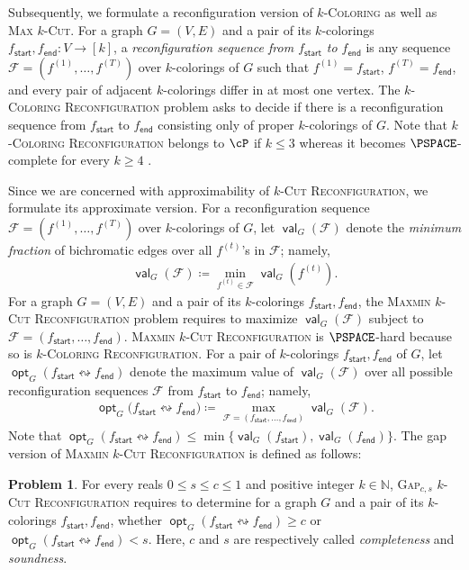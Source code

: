 \documentclass[11pt,fleqn]{article}
\renewcommand{\geq}{\geqslant}
\renewcommand{\leq}{\leqslant}
\newcommand{\prb}[1]{\textsc{#1}\xspace}
\newcommand{\reco}{\leftrightsquigarrow}
\newcommand{\defeq}{\coloneq}
\DeclareMathOperator{\val}{\mathsf{val}}
\DeclareMathOperator{\opt}{\mathsf{opt}}
\newcommand{\sss}{\mathsf{start}}
\newcommand{\ttt}{\mathsf{end}}
\newcommand{\f}{f}
\newcommand{\sqcol}{\scrF}
\newcommand{\kColReconf}{\prb{$k$-Coloring Reconfiguration}}
\newcommand{\kCutReconf}{\prb{$k$-Cut Reconfiguration}}
\newcommand{\MMkCutReconf}{\prb{Maxmin $k$-Cut Reconfiguration}}
\newcommand{\bbN}{\mathbb{N}}
\newcommand{\scrF}{\mathscr{F}}
\theoremstyle{definition}
\newtheorem{problem}[theorem]{Problem}
\numberwithin{equation}{section}
\begin{document}
Subsequently, we formulate a reconfiguration version of
\prb{$k$-Coloring} as well as \prb{Max $k$-Cut}.
For a graph $G=(V,E)$ and a pair of its $k$-colorings
$\f_\sss,\f_\ttt \colon V \to [k]$,
a \emph{reconfiguration sequence from $\f_\sss$ to $\f_\ttt$}
is any sequence
$\sqcol = (\f^{(1)}, \ldots, \f^{(T)})$
over $k$-colorings of $G$
such that
$\f^{(1)} = \f_\sss$,
$\f^{(T)} = \f_\ttt$, and
every pair of adjacent $k$-colorings differ in at most one vertex.
The \kColReconf problem \cite{bonsma2009finding,cereceda2008connectedness,cereceda2011finding,cereceda2009mixing,cereceda2007mixing}
asks to decide
if there is a reconfiguration sequence from $\f_\sss$ to $\f_\ttt$
consisting only of proper $k$-colorings of $G$.
Note that
\kColReconf belongs to $\cP$ if $k \leq 3$ \cite{cereceda2011finding} whereas
it becomes $\PSPACE$-complete for every $k \geq 4$ \cite{bonsma2009finding}.


Since we are concerned with approximability of \kCutReconf, we formulate its approximate version.
For a reconfiguration sequence $\sqcol = (\f^{(1)}, \ldots, \f^{(T)})$ over $k$-colorings of $G$,
let $\val_G(\sqcol)$ denote the \emph{minimum fraction} of bichromatic edges 
over all $\f^{(t)}$'s in $\sqcol$; namely,
\begin{align}
    \val_G(\sqcol) \defeq \min_{\f^{(t)} \in \sqcol} \val_G(\f^{(t)}).
\end{align}
For a graph $G=(V,E)$ and a pair of its $k$-colorings $\f_\sss,\f_\ttt$,
the \MMkCutReconf problem requires to maximize $\val_G(\sqcol)$ subject to
$\sqcol = (\f_\sss, \ldots, \f_\ttt)$.
\MMkCutReconf is $\PSPACE$-hard because so is \kColReconf.
For a pair of $k$-colorings $\f_\sss,\f_\ttt$ of $G$,
let $\opt_G(\f_\sss \reco \f_\ttt)$ denote the maximum value of 
$\val_G(\sqcol)$ over all possible reconfiguration sequences $\sqcol$
from $\f_\sss$ to $\f_\ttt$; namely,
\begin{align}
    \opt_G\bigl(\f_\sss \reco \f_\ttt\bigr)
    \defeq \max_{\sqcol = (\f_\sss, \ldots, \f_\ttt)}
    \val_G(\sqcol).
\end{align}
Note that $\opt_G(\f_\sss \reco \f_\ttt) \leq \min\{\val_G(\f_\sss), \val_G(\f_\ttt)\}$.
The gap version of \MMkCutReconf is defined as follows:


\begin{problem}
For every reals $0 \leq s \leq c \leq 1$ and positive integer $k \in \bbN$,
\prb{Gap$_{c,s}$ \kCutReconf} requires to determine for 
a graph $G$ and a pair of its $k$-colorings $\f_\sss,\f_\ttt$,
whether $\opt_G(\f_\sss \reco \f_\ttt) \geq c$ or
$\opt_G(\f_\sss \reco \f_\ttt) < s$.
Here, $c$ and $s$ are respectively called \emph{completeness} and \emph{soundness}.
\end{problem}\noindent
\end{document}
